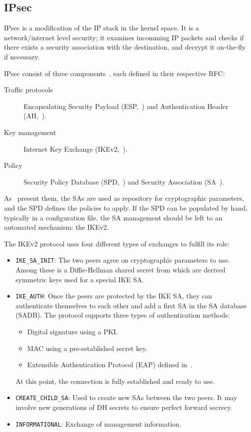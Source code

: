 \subsection{IPsec}
IPsec is a modification of the IP stack in the kernel space.
It is a network/internet level security; it examines incomming IP packets and checks if there exists a security association with the destination, and decrypt it on-the-fly if necessary.


IPsec consist of three components~\cite{cryptoencyclopedia2011}, each defined in their respective RFC:
\begin{description}
	\item[Traffic protocols] Encapsulating Security Payload (ESP,~\cite{rfc4303}) and Authentication Header (AH,~\cite{rfc4302}).
	\item[Key management] Internet Key Exchange (IKEv2,~\cite{rfc7296}).
	\item[Policy]Security Policy Database (SPD,~\cite{rfc4301}) and Security Association (SA~\cite{rfc4301}).
\end{description}

As~\citet{Paterson200672} present them, the SAs are used as repository for cryptographic parameters, and the SPD defines the policies to apply.
If the SPD can be populated by hand, typically in a configuration file, the SA management should be left to an automated mechanism: the IKEv2.

\noindent The IKEv2 protocol uses four different types of exchanges to fulfill its role:
\begin{itemize}
	\item \texttt{IKE\_SA\_INIT}: The two peers agree on cryptographic parameters to use. Among these is a Diffie-Hellman shared secret from which are derived symmetric keys used for a special IKE SA.
	\item \texttt{IKE\_AUTH}: Once the peers are protected by the IKE SA, they can authenticate themselves to each other and add a first SA in the SA database (SADB).
	The protocol supports three types of authentication methods:
	\begin{itemize}
		\item Digital signature using a PKI.
		\item MAC using a pre-established secret key.
		\item Extensible Authentication Protocol (EAP) defined in~\citet{rfc3748}.
	\end{itemize}
	At this point, the connection is fully established and ready to use.
	\item \texttt{CREATE\_CHILD\_SA}: Used to create new SAs between the two peers. It may involve new generations of DH secrets to ensure perfect forward secrecy.
	\item \texttt{INFORMATIONAL}: Exchange of management information.
\end{itemize}\newline{}


